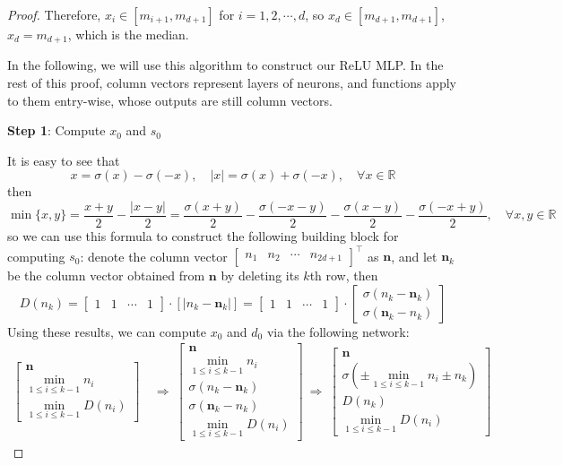 \documentclass{article}
\numberwithin{equation}{section}
\theoremstyle{definition}
\begin{document}
\begin{proof}
Therefore, $x_i\in [m_{i+1},m_{d+1}]$ for $i=1,2,\cdots,d$, so $x_d\in [m_{d+1},m_{d+1}]$, $x_d=m_{d+1}$, which is the median.

In the following, we will use this algorithm to construct our ReLU MLP. In the rest of this proof, column vectors represent layers of neurons, and functions apply to them entry-wise, whose outputs are still column vectors.

\textbf{Step 1}: Compute $x_0$ and $s_0$

It is easy to see that
$$x=\sigma(x)-\sigma(-x), \quad |x|=\sigma(x)+\sigma(-x),
\quad \forall x\in\mathbb{R}$$
then 
$$\min\{x,y\} = \frac{x+y}{2} - \frac{|x-y|}{2} = \frac{\sigma(x+y)}{2} - \frac{\sigma(-x-y)}{2} - \frac{\sigma(x-y)}{2} - \frac{\sigma(-x+y)}{2},
\quad \forall x,y\in\mathbb{R}$$
so we can use this formula to construct the following building block for computing $s_0$: denote the column vector $\begin{bmatrix} n_1 & n_2 & \cdots & n_{2d+1} \end{bmatrix}^{\top}$ as $\mathbf{n}$, and let $\mathbf{n}_k$ be the column vector obtained from $\mathbf{n}$ by deleting its $k$th row, then 
$$D(n_k) = \begin{bmatrix} 1 & 1 & \cdots & 1 \end{bmatrix} \cdot [|n_k-\mathbf{n}_k|] 
= \begin{bmatrix} 1 & 1 & \cdots & 1 \end{bmatrix} \cdot \begin{bmatrix} 
\sigma(n_k-\mathbf{n}_k) \\ \sigma(\mathbf{n}_k-n_k) \end{bmatrix}$$
Using these results, we can compute $x_0$ and $d_0$ via the following network:
\begin{align*}
    \begin{bmatrix} \mathbf{n} \\ \min\limits_{1\le i\le k-1}{n_i} \\ \min\limits_{1\le i\le k-1}{D(n_i)} \end{bmatrix} 
    \ &\Longrightarrow \
    \begin{bmatrix} \mathbf{n} \\ \min\limits_{1\le i\le k-1}{n_i} \\ \sigma(n_k-\mathbf{n}_k) \\ \sigma(\mathbf{n}_k-n_k) \\ \min\limits_{1\le i\le k-1}{D(n_i)} \end{bmatrix}
    \ \Longrightarrow \
    \begin{bmatrix} \mathbf{n} \\ \sigma\left(\pm\min\limits_{1\le i\le k-1}{n_i} \pm n_k\right) \\ D(n_k) \\ \min\limits_{1\le i\le k-1}{D(n_i)} \end{bmatrix}

\end{align*}
\end{proof}
\end{document}
